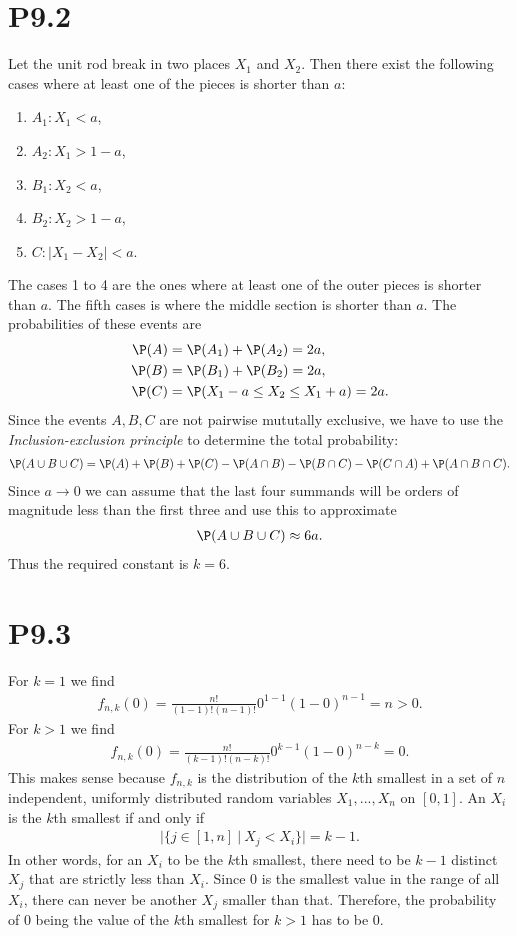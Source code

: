 \documentclass{article}
\begin{document}
\section*{P9.2}

Let the unit rod break in two places $X_1$ and $X_2$. Then there
exist the following cases where at least one of the pieces is shorter
than $a$:
\begin{enumerate}
  \item $A_1:X_1<a$,
  \item $A_2:X_1>1-a$,
  \item $B_1:X_2<a$,
  \item $B_2:X_2>1-a$,
  \item $C:|X_1-X_2|<a$.
\end{enumerate}
The cases 1 to 4 are the ones where at least one of the outer
pieces is shorter than $a$. The fifth cases is where the middle section
is shorter than $a$. The probabilities of these events are
\begin{align*}
  \P(A) & = \P(A_1) + \P(A_2) = 2a,            \\
  \P(B) & = \P(B_1) + \P(B_2) = 2a,            \\
  \P(C) & = \P(X_1-a\leq X_2 \leq X_1+a) = 2a.
\end{align*}
Since the events $A,B,C$ are not pairwise mututally exclusive,
we have to use the \emph{Inclusion-exclusion principle}
to determine the total probability:
\begin{align*}
  \P(A\cup B\cup C) = \P(A) + \P(B) + \P(C) - \P(A \cap B) - \P(B\cap C) - \P(C\cap A) + \P(A\cap B\cap C).
\end{align*}
Since $a\to 0$ we can assume that the last four summands will be
orders of magnitude less than the first three and use this to approximate
\begin{align*}
  \P(A\cup B\cup C) \approx 6a.
\end{align*}
Thus the required constant is $k=6$.

\section*{P9.3}

For $k=1$ we find
\begin{align*}
  f_{n,k}(0) = \frac{n!}{(1-1)!(n-1)!}0^{1-1}(1-0)^{n-1} = n > 0.
\end{align*}
For $k>1$ we find
\begin{align*}
  f_{n,k}(0) = \frac{n!}{(k-1)!(n-k)!}0^{k-1}(1-0)^{n-k} = 0.
\end{align*}
This makes sense because $f_{n,k}$ is the distribution of
the $k$th smallest in a set of $n$ independent, uniformly distributed
random variables $X_1, ..., X_n$ on $[0,1]$.
An $X_i$ is the $k$th smallest if and only if
\begin{align*}
  |\{j \in [1,n]\:|\: X_j < X_i\}| = k-1.
\end{align*} In other words, for an $X_i$ to be
the $k$th smallest, there need to be $k-1$ distinct $X_j$ that are strictly
less than $X_i$. Since $0$ is the smallest value in the range of
all $X_i$, there can never be another $X_j$ smaller than that.
Therefore, the probability of $0$ being the value of the $k$th smallest
for $k>1$ has to be $0$.
\end{document}

